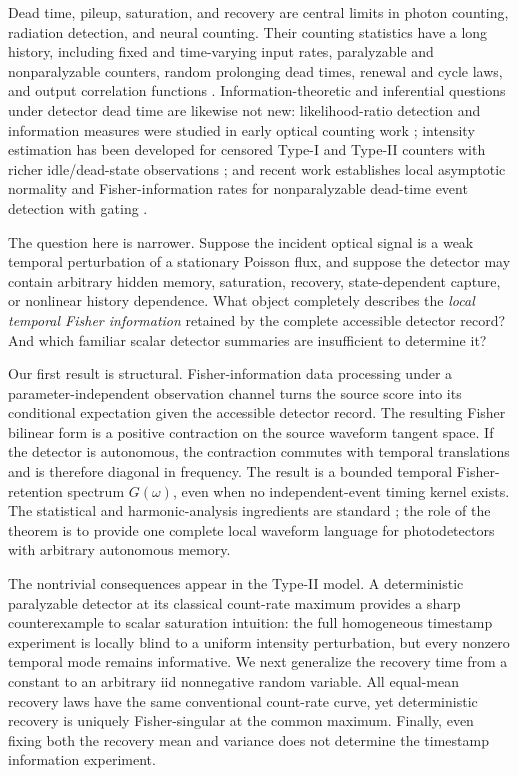 \documentclass[aps,prapplied,preprint,nofootinbib]{revtex4-2}
\begin{document}
Dead time, pileup, saturation, and recovery are central limits in photon counting, radiation detection, and neural counting. Their counting statistics have a long history, including fixed and time-varying input rates, paralyzable and nonparalyzable counters, random prolonging dead times, renewal and cycle laws, and output correlation functions \cite{TeichVannucci1978,VannucciTeich1978,DvurecenskijOsoskov1984,DvurecenskijOsoskov1985,ApanasovichPaltsev1995}. Information-theoretic and inferential questions under detector dead time are likewise not new: likelihood-ratio detection and information measures were studied in early optical counting work \cite{TeichCantor1978}; intensity estimation has been developed for censored Type-I and Type-II counters with richer idle/dead-state observations \cite{BaratDautremerTrigano2006}; and recent work establishes local asymptotic normality and Fisher-information rates for nonparalyzable dead-time event detection with gating \cite{JorgensenJohnson2026}.

The question here is narrower. Suppose the incident optical signal is a weak temporal perturbation of a stationary Poisson flux, and suppose the detector may contain arbitrary hidden memory, saturation, recovery, state-dependent capture, or nonlinear history dependence. What object completely describes the \emph{local temporal Fisher information} retained by the complete accessible detector record? And which familiar scalar detector summaries are insufficient to determine it?

Our first result is structural. Fisher-information data processing under a parameter-independent observation channel turns the source score into its conditional expectation given the accessible detector record. The resulting Fisher bilinear form is a positive contraction on the source waveform tangent space. If the detector is autonomous, the contraction commutes with temporal translations and is therefore diagonal in frequency. The result is a bounded temporal Fisher-retention spectrum $G(\omega)$, even when no independent-event timing kernel exists. The statistical and harmonic-analysis ingredients are standard \cite{Pollard2013,Kallenberg2021,Stein1970,Clark2026}; the role of the theorem is to provide one complete local waveform language for photodetectors with arbitrary autonomous memory.

The nontrivial consequences appear in the Type-II model. A deterministic paralyzable detector at its classical count-rate maximum provides a sharp counterexample to scalar saturation intuition: the full homogeneous timestamp experiment is locally blind to a uniform intensity perturbation, but every nonzero temporal mode remains informative. We next generalize the recovery time from a constant to an arbitrary iid nonnegative random variable. All equal-mean recovery laws have the same conventional count-rate curve, yet deterministic recovery is uniquely Fisher-singular at the common maximum. Finally, even fixing both the recovery mean and variance does not determine the timestamp information experiment.
\end{document}
